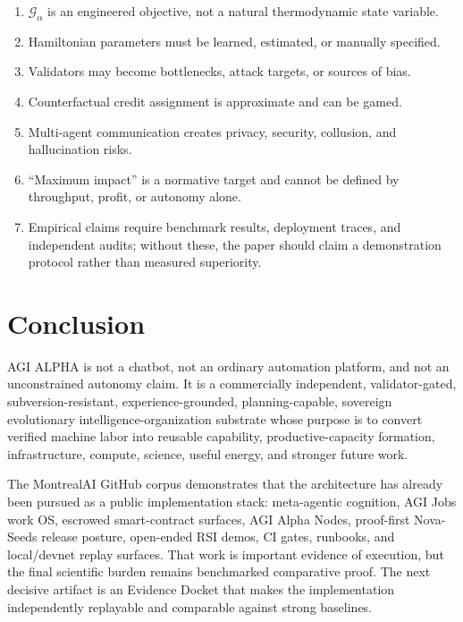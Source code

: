 \begin{enumerate}
\def\labelenumi{\arabic{enumi}.}
\tightlist
\item
  \(\mathcal{G}_{\alpha}\) is an engineered objective, not a natural
  thermodynamic state variable.
\item
  Hamiltonian parameters must be learned, estimated, or manually
  specified.
\item
  Validators may become bottlenecks, attack targets, or sources of bias.
\item
  Counterfactual credit assignment is approximate and can be gamed.
\item
  Multi-agent communication creates privacy, security, collusion, and
  hallucination risks.
\item
  ``Maximum impact'' is a normative target and cannot be defined by
  throughput, profit, or autonomy alone.
\item
  Empirical claims require benchmark results, deployment traces, and
  independent audits; without these, the paper should claim a
  demonstration protocol rather than measured superiority.
\end{enumerate}

\section{Conclusion}\label{conclusion}

AGI ALPHA is not a chatbot, not an ordinary automation platform, and not
an unconstrained autonomy claim. It is a commercially independent,
validator-gated, subversion-resistant, experience-grounded,
planning-capable, sovereign evolutionary intelligence-organization
substrate whose purpose is to convert verified machine labor into
reusable capability, productive-capacity formation, infrastructure,
compute, science, useful energy, and stronger future work.

The MontrealAI GitHub corpus demonstrates that the architecture has
already been pursued as a public implementation stack: meta-agentic
cognition, AGI Jobs work OS, escrowed smart-contract surfaces, AGI Alpha
Nodes, proof-first Nova-Seeds release posture, open-ended RSI demos, CI
gates, runbooks, and local/devnet replay surfaces. That work is
important evidence of execution, but the final scientific burden remains
benchmarked comparative proof. The next decisive artifact is an Evidence
Docket that makes the implementation independently replayable and
comparable against strong baselines.

